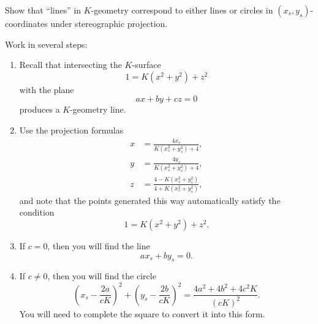 \documentclass[newpage,hints,handout]{ximera}
\begin{document}
\begin{problem}
  Show that ``lines'' in $K$-geometry correspond to either lines or circles in
  $(x_{s},y_{s})$-coordinates under stereographic projection.

  \begin{hint}
    Work in several steps:
\begin{enumerate}
\item Recall that intersecting the $K$-surface
  \[
  1 = K\left(x^2+y^2\right) + z^2 
  \]
  with the plane
  \[
  ax+by+cz = 0
  \]
  produces a $K$-geometry line.
\item Use the projection formulas
  \begin{align*}
      x &= \frac{4x_s}{K(x_s^2 + y_s^2) + 4},\\
      y &= \frac{4y_s}{K(x_s^2 + y_s^2) + 4},\\
      z &= \frac{4-K(x_s^2 + y_s^2)}{4+K(x_s^2 + y_s^2)},
  \end{align*}
  and note that the points generated this way automatically satisfy the condition
  \[
  1 = K(x^2+y^2) + z^2.
  \]
\item If $c=0$, then you will find the line
  \[
   ax_s + by_s = 0.
  \]
\item If $c\ne 0$, then you will find the circle
  \[
   \left(x_s - \frac{2a}{cK}\right)^2 + \left(y_s -
   \frac{2b}{cK}\right)^2 = \frac{4a^2 + 4b^2 + 4c^2K}{(cK)^2}.
   \]
   You will need to complete the square to convert it into this form.
\end{enumerate}
\end{hint}


\end{problem}
\end{document}
